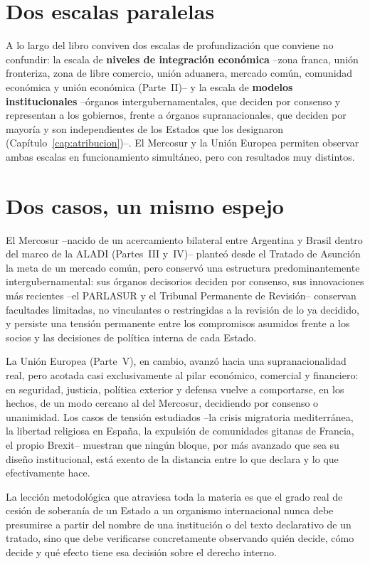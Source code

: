 \documentclass[12pt,oneside]{book}
\begin{document}
\section{Dos escalas paralelas}

A lo largo del libro conviven dos escalas de profundización que conviene no confundir: la escala de \textbf{niveles de integración económica} --zona franca, unión fronteriza, zona de libre comercio, unión aduanera, mercado común, comunidad económica y unión económica (Parte~II)-- y la escala de \textbf{modelos institucionales} --órganos intergubernamentales, que deciden por consenso y representan a los gobiernos, frente a órganos supranacionales, que deciden por mayoría y son independientes de los Estados que los designaron (Capítulo~\ref{cap:atribucion})--. El Mercosur y la Unión Europea permiten observar ambas escalas en funcionamiento simultáneo, pero con resultados muy distintos.

\section{Dos casos, un mismo espejo}

El Mercosur --nacido de un acercamiento bilateral entre Argentina y Brasil dentro del marco de la ALADI (Partes~III y~IV)-- planteó desde el Tratado de Asunción la meta de un mercado común, pero conservó una estructura predominantemente intergubernamental: sus órganos decisorios deciden por consenso, sus innovaciones más recientes --el PARLASUR y el Tribunal Permanente de Revisión-- conservan facultades limitadas, no vinculantes o restringidas a la revisión de lo ya decidido, y persiste una tensión permanente entre los compromisos asumidos frente a los socios y las decisiones de política interna de cada Estado.

La Unión Europea (Parte~V), en cambio, avanzó hacia una supranacionalidad real, pero acotada casi exclusivamente al pilar económico, comercial y financiero: en seguridad, justicia, política exterior y defensa vuelve a comportarse, en los hechos, de un modo cercano al del Mercosur, decidiendo por consenso o unanimidad. Los casos de tensión estudiados --la crisis migratoria mediterránea, la libertad religiosa en España, la expulsión de comunidades gitanas de Francia, el propio Brexit-- muestran que ningún bloque, por más avanzado que sea su diseño institucional, está exento de la distancia entre lo que declara y lo que efectivamente hace.

\begin{importante}
La lección metodológica que atraviesa toda la materia es que el grado real de cesión de soberanía de un Estado a un organismo internacional nunca debe presumirse a partir del nombre de una institución o del texto declarativo de un tratado, sino que debe verificarse concretamente observando quién decide, cómo decide y qué efecto tiene esa decisión sobre el derecho interno.
\end{importante}
\end{document}
